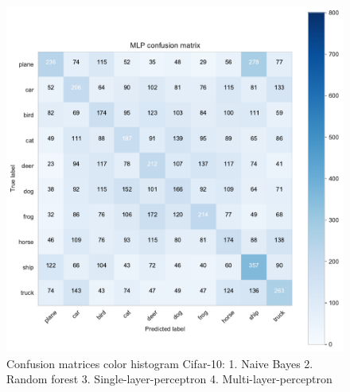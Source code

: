 \documentclass[11pt]{article}
\begin{document}
\begin{figure}[H]
\begin{minipage}[c]{0.5\textwidth}
\end{minipage}
\begin{minipage}[c]{0.5\textwidth}
\includegraphics[width=1\linewidth]{figures/Cifar/CM__MLP_color_hist.pdf}
\end{minipage}
\caption{Confusion matrices color histogram Cifar-10: 1. Naive Bayes 2. Random forest 3. Single-layer-perceptron 4. Multi-layer-perceptron}
\label{CV_Matrices_Cifar_color_hist}
\end{figure}
\end{document}
